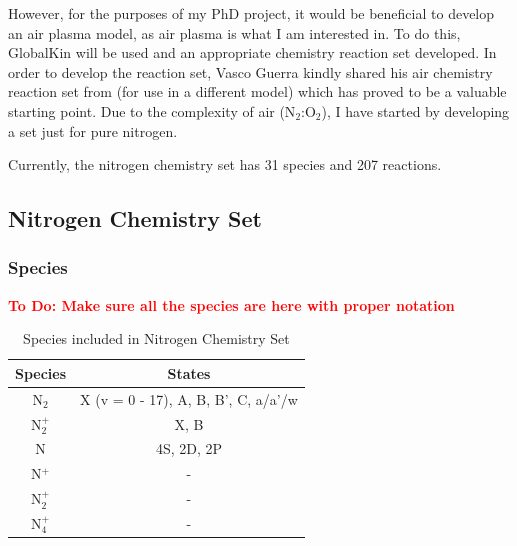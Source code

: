 \documentclass[11pt, oneside]{article}   	%
\newcommand{\todo}[1]{ \textcolor{red}{\bf{To Do:} #1}}
\begin{document}
However, for the purposes of my PhD project, it would be beneficial to develop an air plasma model, as air plasma is what I am interested in.
To do this, GlobalKin will be used and an appropriate chemistry reaction set developed.
In order to develop the reaction set, Vasco Guerra kindly shared his air chemistry reaction set from \cite{Kutasi2016tuning} (for use in a different model) which has proved to be a valuable starting point.
Due to the complexity of air (N$_2$:O$_2$), I have started by developing a set just for pure nitrogen.

Currently, the nitrogen chemistry set has 31 species and 207 reactions.


\subsection{Nitrogen Chemistry Set}
\subsubsection{Species}
\todo{Make sure all the species are here with proper notation}

\begin{table}
\caption{Species included in Nitrogen Chemistry Set}
\begin{center}
\begin{tabular}{| c | c |}
\hline
Species & States \\
\hline\hline \hline
N$_2$ & X (v = 0 - 17), A, B, B', C, a/a'/w\footnotemark  \\
\hline
N$_2^+$ & X, B \\
\hline
N & 4S, 2D, 2P \\
\hline
N$^+$ & - \\
\hline
N$_2^+$ & - \\
\hline
N$_4^+$ & - \\
\hline
\end{tabular}
\end{center}
\end{table}

\end{document}
